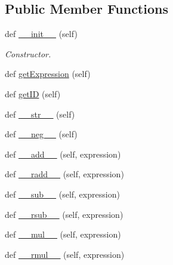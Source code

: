 \subsection*{Public Member Functions}
\begin{DoxyCompactItemize}
\item 
def \hyperlink{classbio__expression_1_1_expression_aa0375c4efc351d1af02688f26a41b907}{\+\_\+\+\_\+init\+\_\+\+\_\+} (self)\hypertarget{classbio__expression_1_1_expression_aa0375c4efc351d1af02688f26a41b907}{}\label{classbio__expression_1_1_expression_aa0375c4efc351d1af02688f26a41b907}

\begin{DoxyCompactList}\small\item\em Constructor. \end{DoxyCompactList}\item 
def \hyperlink{classbio__expression_1_1_expression_a38d9bf655f707d6c43b543f232c0011c}{get\+Expression} (self)
\item 
def \hyperlink{classbio__expression_1_1_expression_a4008b0b487a2b9869377be81b74c62bd}{get\+ID} (self)
\item 
def \hyperlink{classbio__expression_1_1_expression_a3de1ce140768843bb47f187c54cd5094}{\+\_\+\+\_\+str\+\_\+\+\_\+} (self)
\item 
def \hyperlink{classbio__expression_1_1_expression_a249c22deeaec778a1957939a2f38f658}{\+\_\+\+\_\+neg\+\_\+\+\_\+} (self)
\item 
def \hyperlink{classbio__expression_1_1_expression_aaa2fa7c1b65b81f4370716b4b7f13136}{\+\_\+\+\_\+add\+\_\+\+\_\+} (self, expression)
\item 
def \hyperlink{classbio__expression_1_1_expression_a9c5a8a31d20f45742f80458affa712cd}{\+\_\+\+\_\+radd\+\_\+\+\_\+} (self, expression)
\item 
def \hyperlink{classbio__expression_1_1_expression_a13dfc777e295490d603ea41dbda2aad5}{\+\_\+\+\_\+sub\+\_\+\+\_\+} (self, expression)
\item 
def \hyperlink{classbio__expression_1_1_expression_af9b2467515f7e9ab5713bbc4b5a82059}{\+\_\+\+\_\+rsub\+\_\+\+\_\+} (self, expression)
\item 
def \hyperlink{classbio__expression_1_1_expression_ac03517a41c8ba3ce8bc0b5b0e21d3753}{\+\_\+\+\_\+mul\+\_\+\+\_\+} (self, expression)
\item 
def \hyperlink{classbio__expression_1_1_expression_a33d92e31d359e040239e14260d6b389b}{\+\_\+\+\_\+rmul\+\_\+\+\_\+} (self, expression)
\item 

\end{DoxyCompactItemize}
